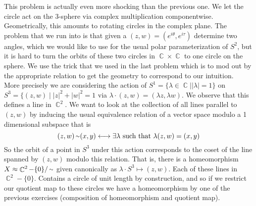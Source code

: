 \documentclass{article}
\DeclareMathOperator{\C}{\mathbb{C}}
\DeclareMathOperator{\suchthat}{\mathrel{|}}
\DeclareMathOperator{\mtilde}{{\raise.17ex\hbox{$\scriptstyle\mathtt{\sim}$}}}
\begin{document}
 This problem is actually even more shocking than the previous one. We let the circle act on the 3-sphere via complex multiplication componentwise. Geometrically, this amounts to rotating circles in the complex plane. The problem that we run into is that given a $(z,w) = (e^{i\theta}, e^{i\tau})$ determine two angles, which we would like to use for the usual polar parameterization of $S^2$, but it is hard to turn the orbits of these two circles in $\C \times \C$ to one circle on the sphere. We use the trick that we used in the last problem which is to mod out by the appropriate relation to get the geometry to correspond to our intuition.\\
\indent More precisely we are considering the action of $S^1 = \{\lambda \in \C | |\lambda| = 1\}$ on $S^3 = \{(z,w) \suchthat |z|^2 + |w|^2 = 1$ via $\lambda \cdot (z,w) = (\lambda z, \lambda w)$. We observe that this defines a line in $\C^2$. We want to look at the collection of all lines parallel to $(z,w)$ by inducing the usual equivalence relation of a vector space modulo a 1 dimensional subspace that is 
\[
(z,w) \mtilde (x,y) \longleftrightarrow \exists \lambda \text{ such that }\lambda(z,w) = (x,y)
\]
So the orbit of a point in $S^3$ under this action corresponds to the coset of the line spanned by $(z,w)$ modulo this relation. That is, there is a homeomorphism $X \approx \C^2 - \{0\}/\mtilde$ given canonically as $\lambda \cdot S^3 \mapsto (z,w)$. Each of these lines in $\C^2 - \{0\}$. Contains a circle of unit length by construction, and so if we restrict our quotient map to these circles we have a homeomorphism by one of the previous exercises (composition of homeomorphism and quotient map). 
\end{document}
